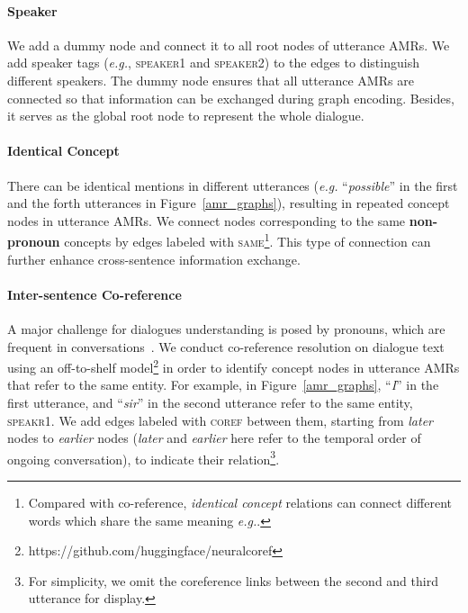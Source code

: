 \documentclass[11pt,a4paper]{article}
\begin{document}
\paragraph{Speaker} We add a dummy node and connect it to all root nodes of utterance AMRs.
We add speaker tags (\emph{e.g.}, \textsc{speaker1} and \textsc{speaker2}) to the edges to distinguish different speakers. 
The dummy node ensures that all utterance AMRs are connected so that information can be exchanged during graph encoding.
Besides, it serves as the global root node to represent the whole dialogue.


\paragraph{Identical Concept} There can be identical mentions in different utterances (\emph{e.g.} ``\textit{possible}'' in the first and the forth utterances in Figure~\ref{amr_graphs}), resulting in repeated concept nodes in utterance AMRs.
We connect nodes corresponding to the same \textbf{non-pronoun} concepts by edges labeled with \textsc{same}\footnote{Compared with co-reference, \textit{identical concept} relations can connect different words which share the same meaning \emph{e.g.}.}. 
This type of connection can further enhance cross-sentence information exchange.


\paragraph{Inter-sentence Co-reference} A major challenge for dialogues understanding is posed by pronouns, which are frequent in conversations~\citep{grosz-etal-1995-centering, newman2008gender, quan2019gecor}. 
We conduct co-reference resolution  on dialogue text using an off-to-shelf model\footnote{https://github.com/huggingface/neuralcoref} in order to identify concept nodes in utterance AMRs that refer to the same entity.
For example, in Figure~\ref{amr_graphs}, ``\textit{I}'' in the first utterance, and ``\textit{sir}'' in the second utterance refer to the same entity, \textsc{speakr1}. 
We add edges labeled with \textsc{coref} between them, starting from \textit{later} nodes to \textit{earlier} nodes (\textit{later} and \textit{earlier} here refer to the temporal order of ongoing conversation), to indicate their relation\footnote{For simplicity, we omit the coreference links between the second and third utterance for display.}.
\end{document}
